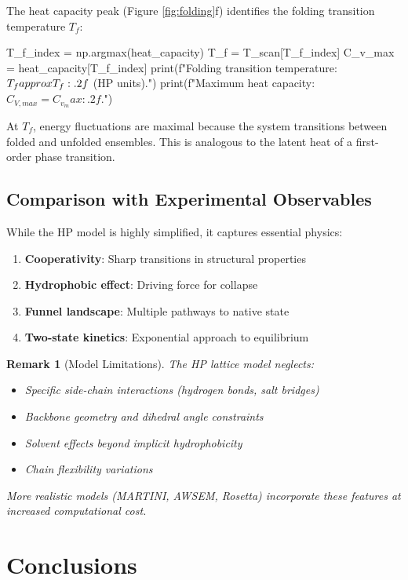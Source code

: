 \documentclass[a4paper, 11pt]{article}
\newtheorem{remark}{Remark}[section]
\begin{document}
The heat capacity peak (Figure \ref{fig:folding}f) identifies the folding transition
temperature $T_f$:

\begin{pycode}
T_f_index = np.argmax(heat_capacity)
T_f = T_scan[T_f_index]
C_v_max = heat_capacity[T_f_index]
print(f"Folding transition temperature: $T_f \\approx {T_f:.2f}$ (HP units).")
print(f"Maximum heat capacity: $C_{{V,max}} = {C_v_max:.2f}$.")
\end{pycode}

At $T_f$, energy fluctuations are maximal because the system transitions between folded
and unfolded ensembles. This is analogous to the latent heat of a first-order phase
transition.

\subsection{Comparison with Experimental Observables}

While the HP model is highly simplified, it captures essential physics:

\begin{enumerate}
\item \textbf{Cooperativity}: Sharp transitions in structural properties
\item \textbf{Hydrophobic effect}: Driving force for collapse
\item \textbf{Funnel landscape}: Multiple pathways to native state
\item \textbf{Two-state kinetics}: Exponential approach to equilibrium
\end{enumerate}

\begin{remark}[Model Limitations]
The HP lattice model neglects:
\begin{itemize}
\item Specific side-chain interactions (hydrogen bonds, salt bridges)
\item Backbone geometry and dihedral angle constraints
\item Solvent effects beyond implicit hydrophobicity
\item Chain flexibility variations
\end{itemize}
More realistic models (MARTINI, AWSEM, Rosetta) incorporate these features at increased
computational cost.
\end{remark}

\section{Conclusions}
\end{document}
